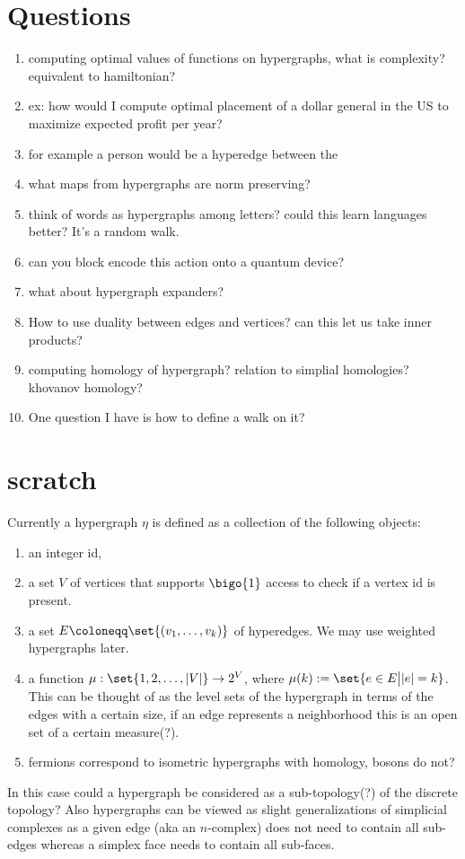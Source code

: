 \section{Questions}
\begin{enumerate} \label{qs}
    \item computing optimal values of functions on hypergraphs, what is complexity? equivalent to hamiltonian? 
    \item ex: how would I compute optimal placement of a dollar general in the US to maximize expected profit per year?
    \item for example a person would be a hyperedge between the 
    \item what maps from hypergraphs are norm preserving?
    \item think of words as hypergraphs among letters? could this learn languages better? It's a random walk.
    \item can you block encode this action onto a quantum device?
    \item what about hypergraph expanders?
    \item How to use duality between edges and vertices? can this let us take inner products?
    \item computing homology of hypergraph? relation to simplial homologies? khovanov homology? 
    \item One question I have is how to define a walk on it?
    
\end{enumerate}


\section{scratch}

Currently a hypergraph $\eta$ is defined as a collection of the following objects:
\begin{enumerate}
    \item an integer id,
    \item a set $V$ of vertices that supports $\bigo{1}$ access to check if a vertex id is present.
    \item a set $E \coloneqq \set{(v_1, \ldots, v_k)}$ of hyperedges. We may use weighted hypergraphs later. 
    \item a function $\mu : \set{1, 2, \ldots, |V|} \to 2^V$, where $\mu(k) := \set{e \in E \big| |e| = k}$. This can be thought of as the level sets of the hypergraph in terms of the edges with a certain size, if an edge represents a neighborhood this is an open set of a certain measure(?). 
    \item fermions correspond to isometric hypergraphs with homology, bosons do not?
\end{enumerate}
In this case could a hypergraph be considered as a sub-topology(?) of the discrete topology? Also hypergraphs can be viewed as slight generalizations of simplicial complexes as a given edge (aka an $n$-complex) does not need to contain all sub-edges whereas a simplex face needs to contain all sub-faces.

